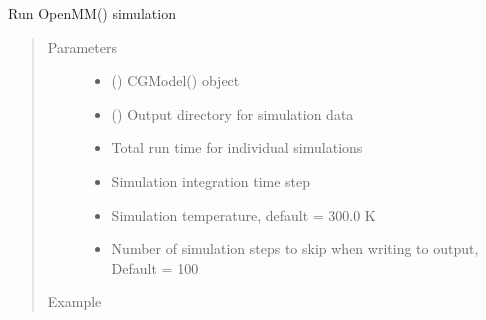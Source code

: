 \documentclass[letterpaper,12pt,english,openany,oneside]{sphinxmanual}
\begin{document}

\begin{fulllineitems}
\label{\detokenize{simulation:simulation.tools.run_simulation}}
Run OpenMM() simulation
\begin{quote}\begin{description}
\item[{Parameters}] \leavevmode\begin{itemize}
\item {} 
 () \textendash{} CGModel() object

\item {} 
 () \textendash{} Output directory for simulation data

\item {} 
 \textendash{} Total run time for individual simulations

\item {} 
 \textendash{} Simulation integration time step

\item {} 
 \textendash{} Simulation temperature, default = 300.0 K

\item {} 
 \textendash{} Number of simulation steps to skip when writing to output, Default = 100

\end{itemize}

\item[{Example}] \leavevmode
\end{description}\end{quote}


\end{fulllineitems}
\end{document}
